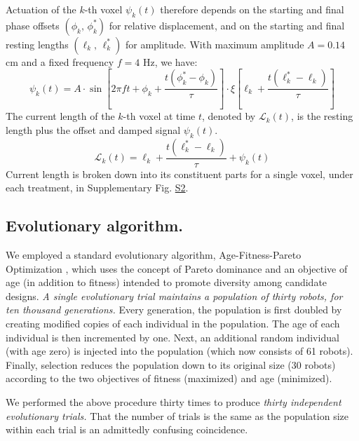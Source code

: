 Actuation of the $k$-th voxel $\psi_k(t)$ therefore depends on the starting and final phase offsets $(\phi_k,\, \phi_k^*)$ for relative displacement, and on the starting and final resting lengths $(\ell_k,\, \ell_k^*)$ for amplitude. With maximum amplitude $A=0.14$ cm and a fixed frequency $f=4$ Hz, we have:
\begin{equation}
\label{eq-actuation}
\psi_k(t) = A \cdot \sin\left[2\pi f t + \phi_k + \frac{t(\phi_k^*-\phi_k)}{\tau}\right] \cdot \xi\left[\ell_k + \frac{t(\ell_k^*-\ell_k)}{\tau}\right]
\end{equation}
The current length of the $k$-th voxel at time $t$, denoted by $\mathcal{L}_k(t)$, is the resting length plus the offset and damped signal $\psi_k(t)$.
\begin{equation}
\label{eq-curr-length}
\mathcal{L}_k(t) = \ell_k + \frac{t(\ell_k^*-\ell_k)}{\tau} + \psi_k(t)
\end{equation}
Current length is broken down into its constituent parts for a single 
voxel, under each treatment, in Supplementary Fig. \hyperref[fig:S2]{S2}.



\subsection{Evolutionary algorithm.}

We employed a standard evolutionary algorithm, Age-Fitness-Pareto Optimization \cite{Schmidt2011}, which uses the concept of Pareto dominance and an objective of age (in addition to fitness) intended to promote diversity among candidate designs. 
\textit{A single evolutionary trial maintains a population of thirty robots, for ten thousand generations.}
Every generation, the population is first doubled by creating modified copies of each individual in the population.
The age of each individual is then incremented by one.
Next, an additional random individual (with age zero) is injected into the population (which now consists of 61 robots). 
Finally, selection reduces the population down to its original size (30 robots) according to the two objectives of fitness (maximized) and age (minimized).

We performed the above procedure thirty times to produce \textit{thirty independent evolutionary trials.}
That the number of trials is the same as the population size within each trial is an admittedly confusing coincidence.

